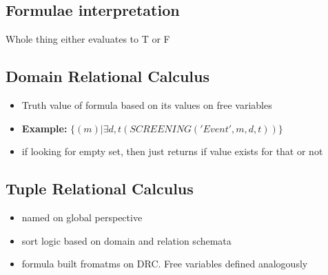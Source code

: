 \documentclass{article}
\newcommand\tab[1][0.5cm]{\hspace*{#1}}
\begin{document}
	\subsection{Formulae interpretation}
		\tab Whole thing either evaluates to T or F

	\subsection{Domain Relational Calculus}
		\begin{itemize}
			\item Truth value of formula based on its values on free variables
			\item \textbf{Example:} $\{ (m) | \exists d, t(SCREENING ('Event', m, d, t)) \}$
			\item if looking for empty set, then just returns if value exists for that or not
		\end{itemize}

	\subsection{Tuple Relational Calculus}
		\begin{itemize}
			\item named on global perspective
			\item sort logic based on domain and relation schemata
			\item formula built fromatms on DRC. Free variables defined analogously
		\end{itemize}
\end{document}
